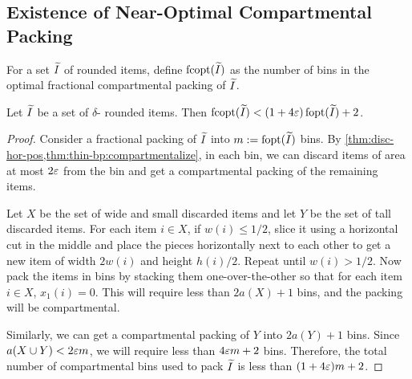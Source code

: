 \subsection{Existence of Near-Optimal Compartmental Packing}

For a set $\widetilde{I}$ of rounded items, define $\operatorname{fcopt}(\widetilde{I})$ as the number of bins in
the optimal fractional compartmental packing of $\widetilde{I}$.

\begin{theorem}
\label{thm:struct}
Let $\widetilde{I}$ be a set of $\delta$-\thin{} rounded items. Then
$\operatorname{fcopt}(\widetilde{I}) < (1+4\varepsilon)\operatorname{fopt}(\widetilde{I}) + 2$.
\end{theorem}
\begin{proof}
Consider a fractional packing of $\widetilde{I}$ into $m := \operatorname{fopt}(\widetilde{I})$ bins.
By \cref{thm:disc-hor-pos,thm:thin-bp:compartmentalize}, in each bin,
we can discard items of area at most $2\varepsilon$ from the bin
and get a compartmental packing of the remaining items.

Let $X$ be the set of wide and small discarded items
and let $Y$ be the set of tall discarded items.
For each item $i \in X$, if $w(i) \le 1/2$, slice it using a horizontal cut in the middle
and place the pieces horizontally next to each other to get a new item
of width $2w(i)$ and height $h(i)/2$. Repeat until $w(i) > 1/2$.
Now pack the items in bins by stacking them one-over-the-other
so that for each item $i \in X$, $x_1(i) = 0$.
This will require less than $2a(X) + 1$ bins,
and the packing will be compartmental.

Similarly, we can get a compartmental packing of $Y$ into $2a(Y) + 1$ bins.
Since $a(X \cup Y) < 2\varepsilon m$, we will require less than $4\varepsilon m + 2$ bins.
Therefore, the total number of compartmental bins used to pack $\widetilde{I}$
is less than $(1 + 4\varepsilon)m + 2$.
\end{proof}
